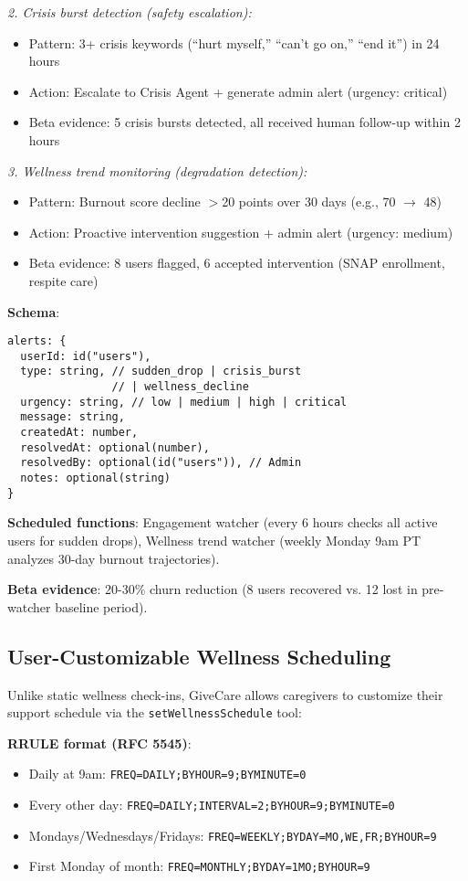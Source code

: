 \documentclass{article}
\begin{document}
\textit{2. Crisis burst detection (safety escalation):}
\begin{itemize}
    \item Pattern: 3+ crisis keywords (``hurt myself,'' ``can't go on,'' ``end it'') in 24 hours
    \item Action: Escalate to Crisis Agent + generate admin alert (urgency: critical)
    \item Beta evidence: 5 crisis bursts detected, all received human follow-up within 2 hours
\end{itemize}

\textit{3. Wellness trend monitoring (degradation detection):}
\begin{itemize}
    \item Pattern: Burnout score decline $>$20 points over 30 days (e.g., 70 $\rightarrow$ 48)
    \item Action: Proactive intervention suggestion + admin alert (urgency: medium)
    \item Beta evidence: 8 users flagged, 6 accepted intervention (SNAP enrollment, respite care)
\end{itemize}

\textbf{Schema}:
\begin{verbatim}
alerts: {
  userId: id("users"),
  type: string, // sudden_drop | crisis_burst
                // | wellness_decline
  urgency: string, // low | medium | high | critical
  message: string,
  createdAt: number,
  resolvedAt: optional(number),
  resolvedBy: optional(id("users")), // Admin
  notes: optional(string)
}
\end{verbatim}

\textbf{Scheduled functions}: Engagement watcher (every 6 hours checks all active users for sudden drops), Wellness trend watcher (weekly Monday 9am PT analyzes 30-day burnout trajectories).

\textbf{Beta evidence}: 20-30\% churn reduction (8 users recovered vs. 12 lost in pre-watcher baseline period).

%
\subsection{User{-}Customizable Wellness Scheduling}%
\label{subsec:User{-}CustomizableWellnessScheduling}%
Unlike static wellness check-ins, GiveCare allows caregivers to customize their support schedule via the \texttt{setWellnessSchedule} tool:

\textbf{RRULE format (RFC 5545)}:
\begin{itemize}
    \item Daily at 9am: \texttt{FREQ=DAILY;BYHOUR=9;BYMINUTE=0}
    \item Every other day: \texttt{FREQ=DAILY;INTERVAL=2;BYHOUR=9;BYMINUTE=0}
    \item Mondays/Wednesdays/Fridays: \texttt{FREQ=WEEKLY;BYDAY=MO,WE,FR;BYHOUR=9}
    \item First Monday of month: \texttt{FREQ=MONTHLY;BYDAY=1MO;BYHOUR=9}
\end{itemize}
\end{document}

